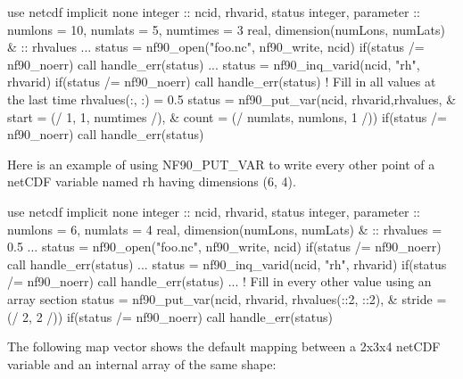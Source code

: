 \begin{DoxyCode}
\textcolor{keywordtype}{use }netcdf
\textcolor{keywordtype}{implicit none}
\textcolor{keywordtype}{integer}            :: ncid, rhvarid, status
\textcolor{keywordtype}{integer}, \textcolor{keywordtype}{parameter} :: numlons = 10, numlats = 5, numtimes = 3
\textcolor{keywordtype}{real}, \textcolor{keywordtype}{dimension(numLons, numLats)} &
                   :: rhvalues
...
status = nf90\_open(\textcolor{stringliteral}{"foo.nc"}, nf90\_write, ncid)
\textcolor{keywordflow}{if}(status /= nf90\_noerr) \textcolor{keyword}{call }handle\_err(status)
...
status = nf90\_inq\_varid(ncid, \textcolor{stringliteral}{"rh"}, rhvarid)
\textcolor{keywordflow}{if}(status /= nf90\_noerr) \textcolor{keyword}{call }handle\_err(status)
\textcolor{comment}{! Fill in all values at the last time}
rhvalues(:, :) = 0.5
status = nf90\_put\_var(ncid, rhvarid,rhvalues,       &
                      start = (/ 1, 1, numtimes /), &
                      count = (/ numlats, numlons, 1 /))
\textcolor{keywordflow}{if}(status /= nf90\_noerr) \textcolor{keyword}{call }handle\_err(status)
\end{DoxyCode}


Here is an example of using N\+F90\+\_\+\+P\+U\+T\+\_\+\+V\+AR to write every other point of a net\+C\+DF variable named rh having dimensions (6, 4).


\begin{DoxyCode}
\textcolor{keywordtype}{use }netcdf
\textcolor{keywordtype}{implicit none}
\textcolor{keywordtype}{integer}            :: ncid, rhvarid, status
\textcolor{keywordtype}{integer}, \textcolor{keywordtype}{parameter} :: numlons = 6, numlats = 4
\textcolor{keywordtype}{real}, \textcolor{keywordtype}{dimension(numLons, numLats)} &
                   :: rhvalues = 0.5
...
status = nf90\_open(\textcolor{stringliteral}{"foo.nc"}, nf90\_write, ncid)
\textcolor{keywordflow}{if}(status /= nf90\_noerr) \textcolor{keyword}{call }handle\_err(status)
...
status = nf90\_inq\_varid(ncid, \textcolor{stringliteral}{"rh"}, rhvarid)
\textcolor{keywordflow}{if}(status /= nf90\_noerr) \textcolor{keyword}{call }handle\_err(status)
...
\textcolor{comment}{! Fill in every other value using an array section}
status = nf90\_put\_var(ncid, rhvarid, rhvalues(::2, ::2), &
                      stride = (/ 2, 2 /))
\textcolor{keywordflow}{if}(status /= nf90\_noerr) \textcolor{keyword}{call }handle\_err(status)
\end{DoxyCode}


The following map vector shows the default mapping between a 2x3x4 net\+C\+DF variable and an internal array of the same shape\+:


